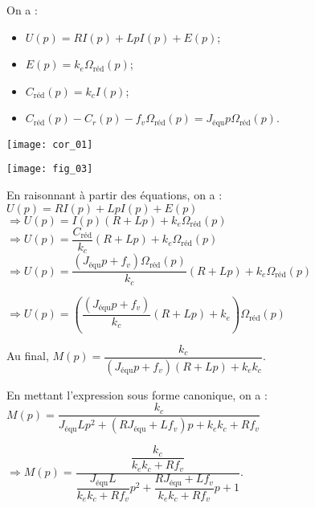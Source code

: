 \begin{multicols}{2}
\fi

\ifprof
\begin{corrige}
On a : 
\begin{itemize}
\item $U(p) = R I(p) + LpI(p)+ E(p)$;
\item $E(p) = k_e  \Omega_{\text{réd}}(p)$;
\item $C_{\text{réd}} (p)= k_c  I(p)$;
\item $C_{\text{réd}} (p) - C_r(p) - f_v \Omega_{\text{réd}}(p)= J_{\text{équ}}  p \Omega_{\text{réd}}(p)$. 
\end{itemize}
\end{corrige}
\begin{center}
\texttt{[image: cor\_01]}
\end{center}

\else
\fi
\ifprof
\else
\begin{center}
\texttt{[image: fig\_03]}
\end{center}
\fi

\ifprof
\begin{corrige}
En raisonnant à partir des équations, on a : 
$U(p) = R I(p) + LpI(p)+ E(p)$ 
$\Rightarrow U(p) = I(p) \left(R + Lp\right)+ k_e  \Omega_{\text{réd}}(p)$
$\Rightarrow U(p) = \dfrac{C_{\text{réd}}}{k_c} \left(R + Lp\right)+ k_e  \Omega_{\text{réd}}(p)$
$\Rightarrow U(p) = \dfrac{\left( J_{\text{équ}}  p +f_v\right)\Omega_{\text{réd}}(p)}{k_c} \left(R + Lp\right)+ k_e  \Omega_{\text{réd}}(p)$

$\Rightarrow U(p) = \left(\dfrac{\left( J_{\text{équ}}  p +f_v\right)}{k_c} \left(R + Lp\right)+ k_e \right) \Omega_{\text{réd}}(p)$

Au final, $M(p)=\dfrac{k_c}{ \left( J_{\text{équ}}  p +f_v\right) \left(R + Lp\right)+ k_e k_c}$.

En mettant l'expression sous forme canonique, on a :
$M(p)=\dfrac{k_c}{   J_{\text{équ}}   Lp^2 +\left( RJ_{\text{équ}}    +  L f_v\right) p + k_e k_c+Rf_v}$

$\Rightarrow  M(p)=\dfrac{\dfrac{k_c}{k_e k_c+Rf_v}}{  \dfrac{ J_{\text{équ}}   L}{k_e k_c+Rf_v}p^2 +\dfrac{ RJ_{\text{équ}}    +  L f_v}{k_e k_c+Rf_v}p +1 }$.


\end{corrige}
\end{multicols}
